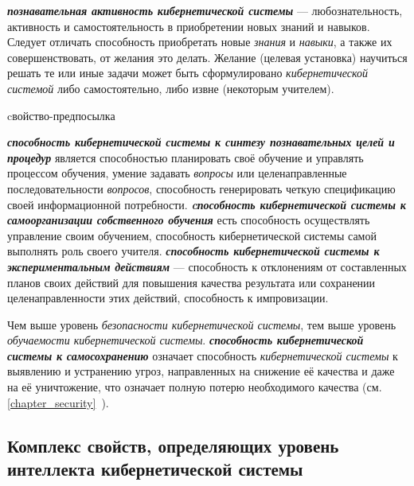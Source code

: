 \textbf{\textit{познавательная активность кибернетической системы}} --- любознательность, активность и самостоятельность в приобретении новых знаний и навыков. Следует отличать способность приобретать новые \textit{знания} и \textit{навыки}, а также их совершенствовать, от желания это делать. Желание (целевая установка) научиться решать те или иные задачи может быть сформулировано \textit{кибернетической системой} либо самостоятельно, либо извне (некоторым учителем).

\begin{SCn}
\begin{scnrelfromlist}{cвойство-предпосылка}
\end{scnrelfromlist}
\end{SCn}

\textbf{\textit{способность кибернетической системы к синтезу познавательных целей и процедур}} является способностью планировать своё обучение и управлять процессом обучения, умение задавать \textit{вопросы} или целенаправленные последовательности \textit{вопросов}, способность генерировать четкую спецификацию своей информационной потребности. \textbf{\textit{cпособность кибернетической системы к самоорганизации собственного обучения}} есть способность осуществлять управление своим обучением, способность кибернетической системы самой выполнять роль своего учителя. \textbf{\textit{способность кибернетической системы к экспериментальным действиям}} --- способность к отклонениям от составленных планов своих действий для повышения качества результата или сохранении целенаправленности этих действий, способность к импровизации.

Чем выше уровень \textit{безопасности кибернетической системы}, тем выше уровень \textit{обучаемости кибернетической системы}.
\textbf{\textit{способность кибернетической системы к самосохранению}} означает способность \textit{кибернетической системы} к выявлению и устранению угроз, направленных на снижение её качества и даже на её уничтожение, что означает полную потерю необходимого качества (см. \ref{chapter_security}~).

\subsection{Комплекс свойств, определяющих уровень интеллекта кибернетической системы}
{\label{sec_cyb_syst_intelligence_quality}} 

